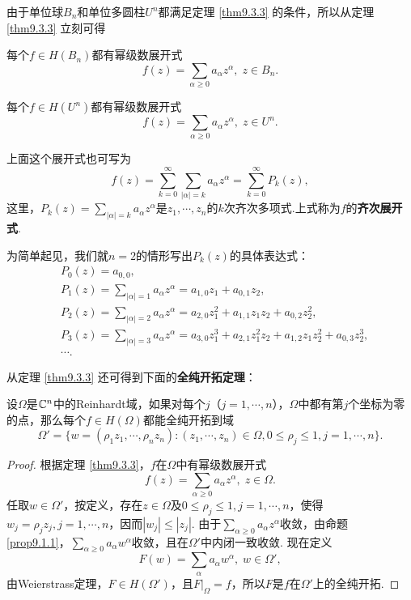 由于单位球$B_n$和单位多圆柱$U^n$都满足定理 \ref{thm9.3.3} 的条件，所以从定理 \ref{thm9.3.3} 立刻可得
\begin{theorem}\label{thm9.3.4}
  每个$f\in H(B_n)$都有幂级数展开式
  \[
    f(z) = \sum_{\alpha\ge0}a_\alpha z^\alpha,\;z\in B_n.
  \]
\end{theorem}

\begin{theorem}\label{thm9.3.5}
  每个$f\in H(U^n)$都有幂级数展开式
  \[
    f(z) = \sum_{\alpha\ge0}a_\alpha z^\alpha,\;z\in U^n.
  \]
\end{theorem}

上面这个展开式也可写为
\[
  f(z) = \sum_{k=0}^\infty\sum_{|\alpha| = k}a_\alpha z^\alpha = \sum_{k=0}^\infty P_k(z),
\]
这里，$P_k(z)=\sum_{|\alpha|=k}a_\alpha z^\alpha$是$z_1,\cdots,z_n$的$k$次齐次多项式.上式称为$f$的\textbf{齐次展开式}.

为简单起见，我们就$n=2$的情形写出$P_k(z)$的具体表达式：
\begin{align*}
  & P_0(z) = a_{0,0},\\
  & P_1(z) = \sum_{|\alpha|=1}a_\alpha z^\alpha = a_{1,0}z_1+a_{0,1}z_2,\\
  & P_2(z) = \sum_{|\alpha|=2}a_\alpha z^\alpha = a_{2,0}z_1^2+a_{1,1}z_1z_2+a_{0,2}z_2^2,\\
  & P_3(z) = \sum_{|\alpha|=3}a_\alpha z^\alpha = a_{3,0}z_1^3+a_{2,1}z_1^2z_2+a_{1,2}z_1z_2^2+a_{0,3}z_2^3,\\
  & \cdots.
\end{align*}

从定理 \ref{thm9.3.3} 还可得到下面的\textbf{全纯开拓定理}：
\begin{theorem}\label{thm9.3.6}
  设$\Omega$是$\mathbb C^n$中的Reinhardt域，如果对每个$j$（$j=1,\cdots,n$），$\Omega$中都有第$j$个坐标为零的点，那么每个$f\in H(\Omega)$都能全纯开拓到域
  \[
    \Omega' = \{w=(\rho_1z_1,\cdots,\rho_nz_n):(z_1,\cdots,z_n)\in\Omega,0\le\rho_j\le1,
    j=1,\cdots,n\}.
  \]
\end{theorem}
\begin{proof}
  根据定理 \ref{thm9.3.3}，$f$在$\Omega$中有幂级数展开式
  \[
    f(z) = \sum_{\alpha\ge0}a_\alpha z^\alpha,\;z\in\Omega.
  \]
  任取$w\in\Omega'$，按定义，存在$z\in\Omega$及$0\le\rho_j\le1,j=1,\cdots,n$，使得$w_j=\rho_jz_j,j=1,\cdots,n$，因而$|w_j|\le|z_j|$. 由于$\sum_{\alpha\ge 0}a_\alpha z^\alpha$收敛，由命题 \ref{prop9.1.1}，$\sum_{\alpha\ge0}a_\alpha w^\alpha$收敛，且在$\Omega'$中内闭一致收敛. 现在定义
  \[
    F(w) = \sum_{\alpha}a_\alpha w^\alpha,\;w\in\Omega',
  \]
  由Weierstrass定理，$F\in H(\Omega')$，且$F\big|_\Omega=f$，所以$F$是$f$在$\Omega'$上的全纯开拓.
\end{proof}

